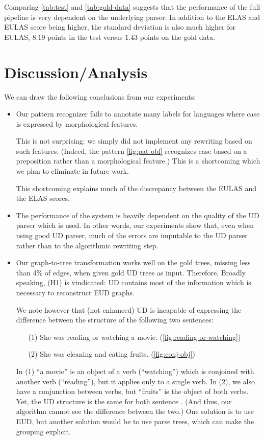 \documentclass[11pt,a4paper]{article}
\begin{document}
Comparing \cref{tab:test} and \cref{tab:gold-data} suggests that the
performance of the full pipeline is very dependent on the underlying
parser. In addition to the ELAS and EULAS score being higher, the
standard deviation is also much higher for EULAS, $8.19$ points in the
test versus $1.43$ points on the gold data.

\section{Discussion/Analysis}

We can draw the following conclusions from our experiments:

\begin{itemize}
\item
  Our pattern recognizer fails to annotate many labels
  for languages where case is expressed by morphological features.
  
  This is not surprising: we simply did not implement any rewriting
  based on such features. (Indeed, the pattern \cref{fig:pat-obl}
  recognizes case based on a preposition rather than a morphological
  feature.) This is a shortcoming which we plan to eliminate in future
  work.

  This shortcoming explains much of the discrepancy between the EULAS
  and the ELAS scores.
  
\item The performance of the system is heavily dependent on the
  quality of the UD parser which is used. In other words, our
  experiments show that, even when using good UD parser, much of the
  errors are imputable to the UD parser rather than to the algorithmic
  rewriting step.

\item Our graph-to-tree transformation works well on the gold trees,
  missing less than 4\% of edges, when given gold UD trees as input.
  Therefore, Broadly speaking, (H1) is vindicated: UD contains most of
  the information which is necessary to reconstruct EUD graphs.

  We note however that (not enhanced) UD is incapable of expressing
  the difference between the structure of the following two sentences:
  
  \begin{itemize}
  \item[(1)] She was reading or watching a movie. (\cref{fig:reading-or-watching})
  \item[(2)] She was cleaning and eating fruits. (\cref{fig:conj-obj})
  \end{itemize}
  In (1) ``a movie'' is an object of a verb (``watching'') which is
  conjoined with another verb (``reading''), but it applies only to a
  single verb. In (2), we also have a conjunction between verbs, but
  ``fruits'' is the object of both verbs. Yet, the UD structure is the
  same for both sentence .  (And thus, our algorithm
  cannot see the difference between the two.)  One solution is to use
  EUD, but another solution would be to use parse trees, which can
  make the grouping explicit.


\end{itemize}
\end{document}
